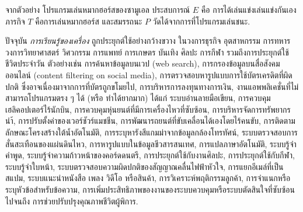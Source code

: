 จากตัวอย่าง โปรแกรมเล่นหมากฮอร์สของซามูเอล 
ประสบการณ์ $E$ คือ การได้เล่นแข่งเล่นแข่งกันเอง
ภารกิจ $T$ คือการเล่นหมากฮอร์ส
และสมรรถนะ $P$ วัดได้จากการที่โปรแกรมเล่นชนะ.
%

%


ปัจจุบัน \textit{การเรียนรู้ของเครื่อง} ถูกประยุกต์ใช้อย่างกว้างขวาง
ในวงการธุรกิจ อุตสาหกรรม การทหาร วงการวิทยาศาสตร์ วิศวกรรม การแพทย์ การเกษตร บันเทิง ศิลปะ การกีฬา รวมถึงการประยุกต์ใช้ชีวิตประจำวัน
ตัวอย่างเช่น 
การค้นหาข้อมูลบนเวป (web search), 
การกรองข้อมูลบนสื่อสังคมออนไลน์ (content filtering on social media),
การตรวจสอบหารูปแบบการใช้บัตรเครดิตที่ผิดปกติ\cite{DeviEtAl2014a} ซึ่งอาจเนื่องมาจากการที่บัตรถูกขโมยไป,
การบริหารการลงทุนทางการเงิน\cite{TanEtAl2011a},
งานแอพพลิเคชั่นที่ไม่สามารถโปรแกรมตรง ๆ ได้ (หรือ ทำได้ยากมาก) ได้แก่ ระบบอ่านลายมือเขียน\cite{LeCunEtAl1990a},
การควบคุมเฮลิคอปเตอร์ไร้นักบิน\cite{CoatesEtAl2009a}, 
การควบคุมหุ่นยนต์ที่มีการเครื่องไหวที่ซับซ้อน\cite{AkiyamaEtAl2010a},
การบริหารจัดการทรัพยากรนำ้\cite{CastellettiEtAl2013a},
การปรับตั้งค่าของเวอร์ชัวร์แมชชีน\cite{RaoEtAl2009a},
การพัฒนารถยนต์ที่ขับเคลื่อนได้เองโดยไร้คนขับ\cite{ZhuEtAl2014a},
การติดตามลักษณะโครงสร้างใต้น้ำอัตโนมัติ\cite{MagazzeniEtAl2014a},
การระบุหารังสีแกมม่าจากข้อมูลกล้องโทรทัศน์\cite{BockEtAl2004a},
ระบบตรวจสอบการสั่นสะเทือนของแผ่นดินไหว\cite{RuanoEtAl2014a},
การหารูปแบบในข้อมูลชีวสารสนเทศ\cite{KelchtermansEtAl2014a},
การแปลภาษาอัตโนมัติ\cite{CostaFarrus2014a},
ระบบรู้จำคำพูด\cite{SarikayaEtAl2014a},
ระบบรู้จำความก้าวหน้าของคอร์ดดนตรี\cite{YuElAl2013a},
การประยุกต์ใช้กับงานศิลปะ\cite{CuljakEtAl2011a},
การประยุกต์ใช้กับกีฬา\cite{HolstJanasson2013a},
ระบบรู้จำใบหน้า\cite{BarnardEtAl2013a},
ระบบตรวจสอบความผิดปกติของสัญญาณคลื่นไฟฟ้าหัวใจ\cite{LiEtAl2012a},
การแยกอีเมล์ที่เป็นสแปม\cite{BlanzieriBryl2008a},
ระบบแนะนำหนังสือ เพลง วิดีโอ หรือสินค้า\cite{GhazanfarPrugel-Bennett2014a},
การวิเคราะห์พฤติกรรมลูกค้า\cite{KatanyukulPonsawat2017a},
การจำแนกหรือระบุหัวข้อสำหรับข้อความ\cite{BleiEtAl2003a},
การเพิ่มประสิทธิภาพของงานของระบบควบคุมหรือระบบตัดสินใจที่ซับซ้อน%
\cite{AndersonEtAl2004a,KatanyukulEtAl2011a, KatanyukulEtAl2012a, Katanyukul2013a, KatanyukulChong2014a, ChanlohaEtAl2014a}
ไปจนถึง การช่วยปรับปรุงคุณภาพชีวิตผู้พิการ\cite{NakjaiKatanyukul2019a}.

